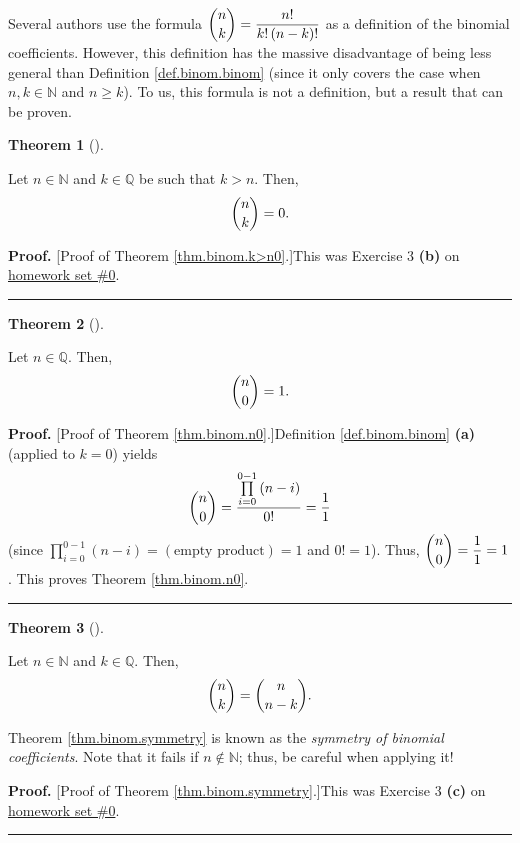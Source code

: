\documentclass[numbers=enddot,12pt,final,onecolumn,notitlepage]{scrartcl}%
\numberwithin{exer}{subsection}
\theoremstyle{definition}
\newtheorem{theo}{Theorem}[subsection]
\newenvironment{theorem}[1][]
{\begin{theo}[#1]\begin{leftbar}}
{\end{leftbar}\end{theo}}
\newenvironment{proof}[1][Proof]{\noindent\textbf{#1.} }{\ \rule{0.5em}{0.5em}}
\let\prodnonlimits\prod
\renewcommand{\prod}{\prodnonlimits\limits}
\begin{document}
Several authors use the formula $\dbinom{n}{k}=\dfrac{n!}{k!\left(
n-k\right)  !}$ as a definition of the binomial coefficients. However, this
definition has the massive disadvantage of being less general than Definition
\ref{def.binom.binom} (since it only covers the case when $n,k\in\mathbb{N}$
and $n\geq k$). To us, this formula is not a definition, but a result that can
be proven.

\begin{theorem}
\label{thm.binom.k>n0}Let $n\in\mathbb{N}$ and $k\in\mathbb{Q}$ be such that
$k>n$. Then,
\[
\dbinom{n}{k}=0.
\]

\end{theorem}

\begin{proof}
[Proof of Theorem \ref{thm.binom.k>n0}.]This was Exercise 3 \textbf{(b)} on
\href{http://www-users.math.umn.edu/~dgrinber/19s/hw0s.pdf}{homework set \#0}.
\end{proof}

\begin{theorem}
\label{thm.binom.n0}Let $n\in\mathbb{Q}$. Then,%
\[
\dbinom{n}{0}=1.
\]

\end{theorem}

\begin{proof}
[Proof of Theorem \ref{thm.binom.n0}.]Definition \ref{def.binom.binom}
\textbf{(a)} (applied to $k=0$) yields%
\[
\dbinom{n}{0}=\dfrac{\prod_{i=0}^{0-1}\left(  n-i\right)  }{0!}=\dfrac{1}{1}%
\]
(since $\prod_{i=0}^{0-1}\left(  n-i\right)  =\left(  \text{empty
product}\right)  =1$ and $0!=1$). Thus, $\dbinom{n}{0}=\dfrac{1}{1}=1$. This
proves Theorem \ref{thm.binom.n0}.
\end{proof}

\begin{theorem}
\label{thm.binom.symmetry}Let $n\in\mathbb{N}$ and $k\in\mathbb{Q}$. Then,%
\[
\dbinom{n}{k}=\dbinom{n}{n-k}.
\]

\end{theorem}

Theorem \ref{thm.binom.symmetry} is known as the \textit{symmetry of binomial
coefficients}. Note that it fails if $n\notin\mathbb{N}$; thus, be careful
when applying it!

\begin{proof}
[Proof of Theorem \ref{thm.binom.symmetry}.]This was Exercise 3 \textbf{(c)}
on \href{http://www-users.math.umn.edu/~dgrinber/19s/hw0s.pdf}{homework set
\#0}.
\end{proof}
\end{document}

